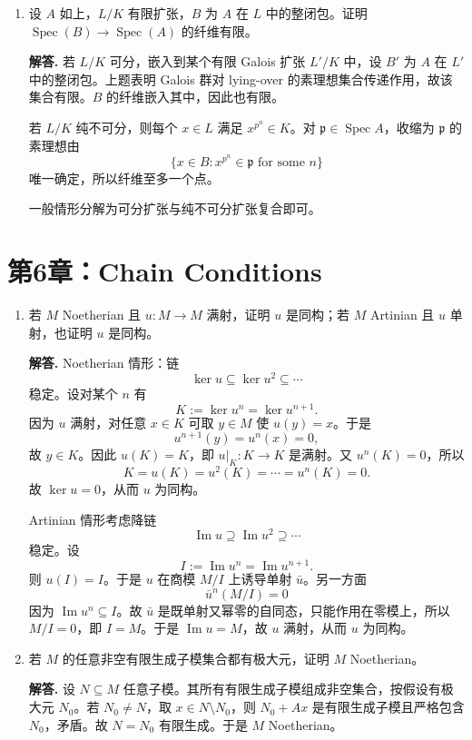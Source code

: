 \documentclass[a4paper]{ctexart}
\begin{document}
\begin{enumerate}[leftmargin=*, label=\textbf{5.\arabic*.}]
显然 \(A\subseteq B^G\)。反过来若 \(x\in B^G\)，则 \(x\in L^G=K\)。又 \(x\) 整于 \(A\)，而 \(A\) 在 \(K\) 中整闭，故 \(x\in A\)。所以 \(B^G=A\)。

\setcounter{enumi}{14}
\item 设 \(A\) 如上，\(L/K\) 有限扩张，\(B\) 为 \(A\) 在 \(L\) 中的整闭包。证明 \(\operatorname{Spec}(B)\to \operatorname{Spec}(A)\) 的纤维有限。

\textbf{解答.}
若 \(L/K\) 可分，嵌入到某个有限 Galois 扩张 \(L'/K\) 中，设 \(B'\) 为 \(A\) 在 \(L'\) 中的整闭包。上题表明 Galois 群对 lying-over 的素理想集合传递作用，故该集合有限。\(B\) 的纤维嵌入其中，因此也有限。

若 \(L/K\) 纯不可分，则每个 \(x\in L\) 满足 \(x^{p^n}\in K\)。对 \(\mathfrak p\in \operatorname{Spec}A\)，收缩为 \(\mathfrak p\) 的素理想由
\[
\{x\in B: x^{p^n}\in \mathfrak p \text{ for some } n\}
\]
唯一确定，所以纤维至多一个点。

一般情形分解为可分扩张与纯不可分扩张复合即可。
\end{enumerate}

\section{第6章：Chain Conditions}

\begin{enumerate}[leftmargin=*, label=\textbf{6.\arabic*.}]
\item 若 \(M\) Noetherian 且 \(u:M\to M\) 满射，证明 \(u\) 是同构；若 \(M\) Artinian 且 \(u\) 单射，也证明 \(u\) 是同构。

\textbf{解答.}
Noetherian 情形：链
\[
\ker u \subseteq \ker u^2 \subseteq \cdots
\]
稳定。设对某个 \(n\) 有
\[
K:=\ker u^n=\ker u^{n+1}.
\]
因为 \(u\) 满射，对任意 \(x\in K\) 可取 \(y\in M\) 使 \(u(y)=x\)。于是
\[
u^{n+1}(y)=u^n(x)=0,
\]
故 \(y\in K\)。因此 \(u(K)=K\)，即 \(u|_K:K\to K\) 是满射。又 \(u^n(K)=0\)，所以
\[
K=u(K)=u^2(K)=\cdots=u^n(K)=0.
\]
故 \(\ker u=0\)，从而 \(u\) 为同构。

Artinian 情形考虑降链
\[
\operatorname{Im}u \supseteq \operatorname{Im}u^2 \supseteq \cdots
\]
稳定。设
\[
I:=\operatorname{Im}u^n=\operatorname{Im}u^{n+1}.
\]
则 \(u(I)=I\)。于是 \(u\) 在商模 \(M/I\) 上诱导单射 \(\bar u\)。另一方面
\[
\bar u^n(M/I)=0
\]
因为 \(\operatorname{Im}u^n\subseteq I\)。故 \(\bar u\) 是既单射又幂零的自同态，只能作用在零模上，所以 \(M/I=0\)，即 \(I=M\)。于是 \(\operatorname{Im}u=M\)，故 \(u\) 满射，从而 \(u\) 为同构。

\item 若 \(M\) 的任意非空有限生成子模集合都有极大元，证明 \(M\) Noetherian。

\textbf{解答.}
设 \(N\subseteq M\) 任意子模。其所有有限生成子模组成非空集合，按假设有极大元 \(N_0\)。若 \(N_0\ne N\)，取 \(x\in N\setminus N_0\)，则 \(N_0+Ax\) 是有限生成子模且严格包含 \(N_0\)，矛盾。故 \(N=N_0\) 有限生成。于是 \(M\) Noetherian。
\end{enumerate}
\end{document}
